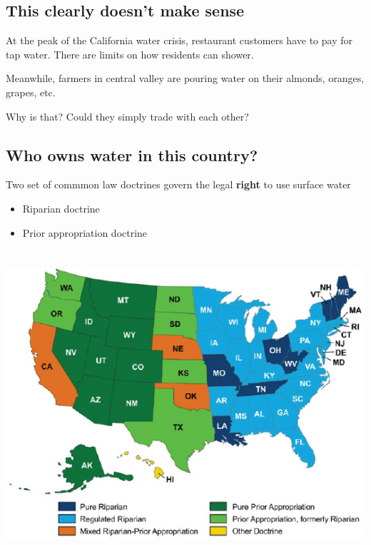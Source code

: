 \documentclass[]{article}
\providecommand{\tightlist}{%
  \setlength{\itemsep}{0pt}\setlength{\parskip}{0pt}}
\begin{document}
\hypertarget{this-clearly-doesnt-make-sense}{%
\subsection{This clearly doesn't make
sense}\label{this-clearly-doesnt-make-sense}}

At the peak of the California water crisis, restaurant customers have to
pay for tap water. There are limits on how residents can shower.

Meanwhile, farmers in central valley are pouring water on their almonds,
oranges, grapes, etc.

Why is that? Could they simply trade with each other?

\hypertarget{who-owns-water-in-this-country}{%
\subsection{Who owns water in this
country?}\label{who-owns-water-in-this-country}}

Two set of commmon law doctrines govern the legal \textbf{right} to use
surface water

\begin{itemize}
\tightlist
\item
  Riparian doctrine
\item
  Prior appropriation doctrine
\end{itemize}

\hypertarget{section-29}{%
\subsection{}\label{section-29}}

\includegraphics[width=\textwidth,height=4.16667in]{figures/m10_pa_map.jpg}
\end{document}
